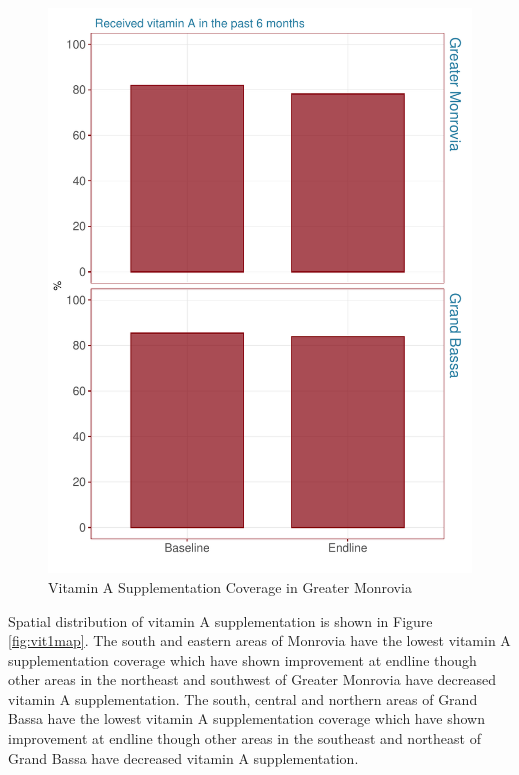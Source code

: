 \documentclass[12pt,a4paper]{article}
\begin{document}
\begin{figure}[H]

{\centering \includegraphics{liberiaCoverageFinalReport_files/figure-latex/vit1plot-1} 

}

\caption{Vitamin A Supplementation Coverage in Greater Monrovia}\label{fig:vit1plot}
\end{figure}

Spatial distribution of vitamin A supplementation is shown in Figure \ref{fig:vit1map}. The south and eastern areas of Monrovia have the lowest vitamin A supplementation coverage which have shown improvement at endline though other areas in the northeast and southwest of Greater Monrovia have decreased vitamin A supplementation. The south, central and northern areas of Grand Bassa have the lowest vitamin A supplementation coverage which have shown improvement at endline though other areas in the southeast and northeast of Grand Bassa have decreased vitamin A supplementation.
\end{document}
